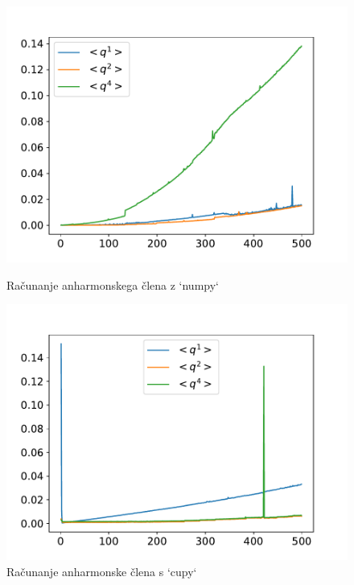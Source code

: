 \documentclass{article}
\begin{document}
\begin{figure}[H]
    \centering
    \begin{minipage}{0.49\textwidth}
        \centering
        \includegraphics[width=\linewidth]{cpu.pdf}
        \caption{Računanje anharmonskega člena z `numpy`}
    \end{minipage}
    \hfill
    \begin{minipage}{0.49\textwidth}
        \centering
        \includegraphics[width=\linewidth]{gpu.pdf}
        \caption{Računanje anharmonske člena s `cupy`}
    \end{minipage}
\end{figure}
\end{document}
